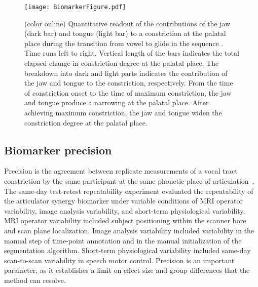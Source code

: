 \documentclass[preprint]{JASAnew}\usepackage[]{graphicx}\usepackage[]{color}
\begin{document}
\begin{figure}

\texttt{[image: BiomarkerFigure.pdf]}

\caption{(color online) Quantitative readout of the contributions of the jaw (dark bar) and tongue (light bar) to a constriction at the palatal place during the transition from vowel \textipa{[a]} to glide \textipa{[j]} in the sequence \textipa{[aja]}. 
%
Time runs left to right.
%
Vertical length of the bars indicates the total elapsed change in constriction degree at the palatal place.
%
The breakdown into dark and light parts indicates the contribution of the jaw and tongue to the constriction, respectively.
%
From the time of constriction onset to the time of maximum constriction, the jaw and tongue produce a narrowing at the palatal place. 
%
After achieving maximum constriction, the jaw and tongue widen the constriction degree at the palatal place.}
\label{fig:biomarkerFigure}%
\end{figure}





\subsection{Biomarker precision}
\label{subsec:repeatability}

Precision is the agreement between replicate measurements of a vocal tract constriction by the same participant at the same phonetic place of articulation~\citep{kessler2015emerging,sullivan2015metrology}. 
%
The same-day test-retest repeatability experiment evaluated the repeatability of the articulator synergy biomarker under variable conditions of MRI operator variability, image analysis variability, and short-term physiological variability. 
%
MRI operator variability included subject positioning within the scanner bore and scan plane localization. 
%
Image analysis variability included variability in the manual step of time-point annotation and in the manual initialization of the segmentation algorithm. 
%
Short-term physiological variability included same-day scan-to-scan variability in speech motor control. 
%
Precision is an important parameter, as it establishes a limit on effect size and group differences that the method can resolve.
\end{document}
